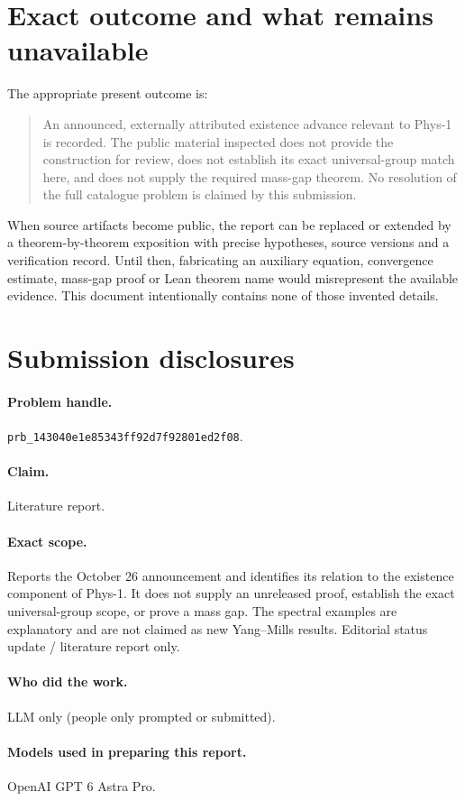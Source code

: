 \documentclass[11pt,a4paper]{article}
\numberwithin{equation}{section}
\theoremstyle{definition}
\theoremstyle{remark}
\begin{document}
\section{Exact outcome and what remains unavailable}
The appropriate present outcome is:
\begin{quote}
An announced, externally attributed existence advance relevant to Phys-1 is
recorded. The public material inspected does not provide the construction for
review, does not establish its exact universal-group match here, and does not
supply the required mass-gap theorem. No resolution of the full catalogue
problem is claimed by this submission.
\end{quote}

When source artifacts become public, the report can be replaced or extended by
a theorem-by-theorem exposition with precise hypotheses, source versions and a
verification record. Until then, fabricating an auxiliary equation, convergence
estimate, mass-gap proof or Lean theorem name would misrepresent the available
evidence. This document intentionally contains none of those invented details.

\section{Submission disclosures}
\paragraph{Problem handle.} \texttt{prb\_143040e1e85343ff92d7f92801ed2f08}.
\paragraph{Claim.} Literature report.
\paragraph{Exact scope.} Reports the October 26 announcement and identifies its relation
to the existence component of Phys-1. It does not supply an unreleased proof,
establish the exact universal-group scope, or prove a mass gap. The spectral
examples are explanatory and are not claimed as new Yang--Mills results.
Editorial status update / literature report only.
\paragraph{Who did the work.} LLM only (people only prompted or submitted).
\paragraph{Models used in preparing this report.} OpenAI GPT 6 Astra Pro.
\end{document}
